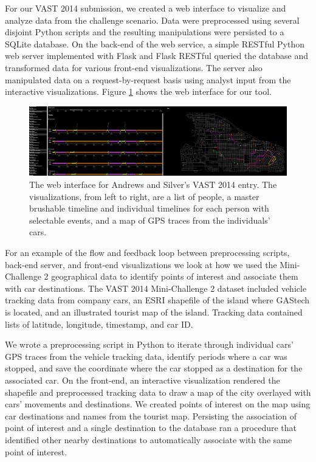 \documentclass[midd]{thesis}
\begin{document}
For our VAST 2014 submission, we created a web interface to visualize and
analyze data from the challenge scenario. Data were preprocessed using several
disjoint Python scripts and the resulting manipulations were persisted to a
SQLite database. On the back-end of the web service, a simple RESTful Python web
server implemented with Flask \cite{flask} and Flask RESTful
\cite{flask-restful} queried the database and transformed data for various
front-end visualizations. The server also manipulated data on a
request-by-request basis using analyst input from the interactive
visualizations. Figure \ref{fig:vast2014} shows the web interface for our tool.

\begin{figure}[!ht]
  \centering
  \includegraphics[width=1\textwidth]{vast-mc2-2014-cropped-scaled}
  \caption[Web interface for the VAST 2014 entry.]{The web interface for Andrews
  and Silver's VAST 2014 entry. The visualizations, from left to right, are a
  list of people, a master brushable timeline and individual timelines for each
  person with selectable events, and a map of GPS traces from the
  individuals' cars.}
  \label{fig:vast2014}
\end{figure}

For an example of the flow and feedback loop between preprocessing scripts,
back-end server, and front-end visualizations we look at how we used the
Mini-Challenge 2 geographical data to identify points of interest and associate
them with car destinations. The VAST 2014 Mini-Challenge 2 dataset included
vehicle tracking data from company cars, an ESRI shapefile of the island where
GAStech is located, and an illustrated tourist map of the island. Tracking data
contained lists of latitude, longitude, timestamp, and car ID.

We wrote a preprocessing script in Python to iterate through individual
cars' GPS traces from the vehicle tracking data, identify periods where a car
was stopped, and save the coordinate where the car stopped as a destination for
the associated car. On the front-end, an interactive visualization rendered the
shapefile and preprocessed tracking data to draw a map of the city overlayed
with cars' movements and destinations. We created points of interest on the map
using car destinations and names from the tourist map. Persisting the
association of point of interest and a single destination to the database ran a
procedure that identified other nearby destinations to automatically associate
with the same point of interest.
\end{document}
